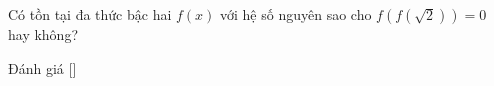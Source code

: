 \ifshowproblem
\begin{problem}\label{problem:RUS-2015-SMO-9-P1}
    Có tồn tại đa thức bậc hai \( f(x) \) với hệ số nguyên sao cho \( f(f(\sqrt{2})) = 0 \) hay không?
\end{problem}
\fi

\ifshowinfo
Đánh giá [\textbf{}]\footnotemark
{}
\fi